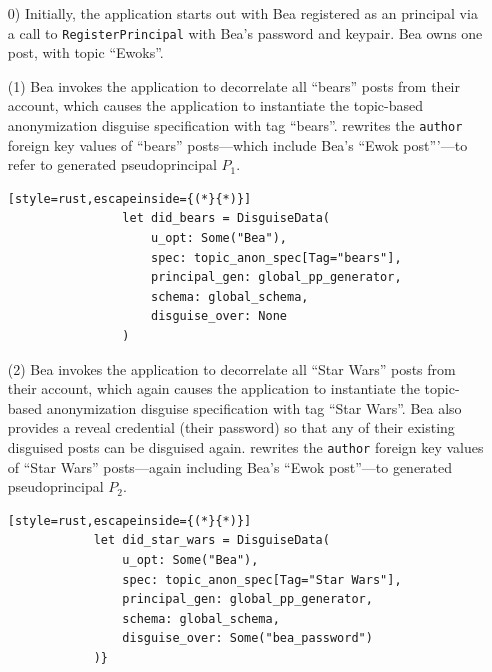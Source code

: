 \begin{enumerate}[nosep]
    \item[0)] Initially, the application starts out with Bea registered as an
        \sys principal via a call to \texttt{RegisterPrincipal} with Bea's
        password and keypair. Bea owns one post, with topic ``Ewoks''.

    \item[(1)] Bea invokes the application to decorrelate all ``bears'' posts
        from their account, which causes the application to instantiate the
        topic-based anonymization disguise specification with tag ``bears''.
        \sys rewrites the \texttt{author} foreign key values of ``bears''
        posts---which include Bea's ``Ewok post'''---to refer to generated
        pseudoprincipal $P_1$.

            \vspace{12pt}
            \begin{lstlisting}[style=rust,escapeinside={(*}{*)}]
                let did_bears = DisguiseData(
                    u_opt: Some("Bea"), 
                    spec: topic_anon_spec[Tag="bears"],
                    principal_gen: global_pp_generator,
                    schema: global_schema,
                    disguise_over: None
                )
            \end{lstlisting}

        \item[(2)] Bea invokes the application to decorrelate all ``Star Wars'' posts from
        their account, which again causes the application to instantiate the topic-based
        anonymization disguise specification with tag ``Star Wars''. Bea also
        provides a reveal credential (\eg their password) so that any of their existing
        disguised posts can be disguised again. \sys rewrites the
        \texttt{author} foreign key values of ``Star Wars'' posts---again including
        Bea's ``Ewok post''---to generated
        pseudoprincipal $P_2$.

        \vspace{12pt}
        \begin{lstlisting}[style=rust,escapeinside={(*}{*)}]
            let did_star_wars = DisguiseData(
                u_opt: Some("Bea"), 
                spec: topic_anon_spec[Tag="Star Wars"],
                principal_gen: global_pp_generator,
                schema: global_schema,
                disguise_over: Some("bea_password")
            )}
        \end{lstlisting}
    

\end{enumerate}
